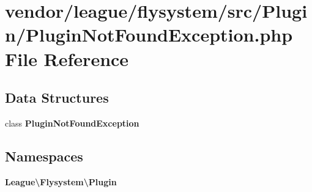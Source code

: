 \section{vendor/league/flysystem/src/\+Plugin/\+Plugin\+Not\+Found\+Exception.php File Reference}
\label{_plugin_not_found_exception_8php}
\subsection*{Data Structures}
\begin{DoxyCompactItemize}
\item 
class {\bf Plugin\+Not\+Found\+Exception}
\end{DoxyCompactItemize}
\subsection*{Namespaces}
\begin{DoxyCompactItemize}
\item 
 {\bf League\textbackslash{}\+Flysystem\textbackslash{}\+Plugin}
\end{DoxyCompactItemize}
